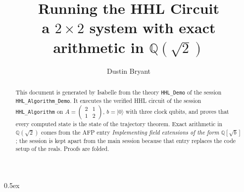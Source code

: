 \documentclass[11pt,a4paper]{article}
\newcommand{\ket}[1]{|#1\rangle}
\begin{document}
\title{Running the HHL Circuit\\[0.5em]
  \large a $2\times2$ system with exact arithmetic in $\mathbb Q(\sqrt2)$}
\author{Dustin Bryant}
\maketitle

\begin{abstract}
This document is generated by Isabelle from the theory \texttt{HHL\_Demo} of the session
\texttt{HHL\_Algorithm\_Demo}.  It executes the verified HHL circuit of the session \texttt{HHL\_Algorithm} on
$A=\begin{pmatrix}2&1\\1&2\end{pmatrix}$, $b=\ket0$ with three clock qubits, and proves that
every computed state is the state of the trajectory theorem.  Exact arithmetic in
$\mathbb Q(\sqrt2)$ comes from the AFP entry \emph{Implementing field extensions of the form
$\mathbb Q[\sqrt b]$}; the session is kept apart from the main session because that entry
replaces the code setup of the reals.  Proofs are folded.
\end{abstract}

\parindent 0pt\parskip 0.5ex


\end{document}
